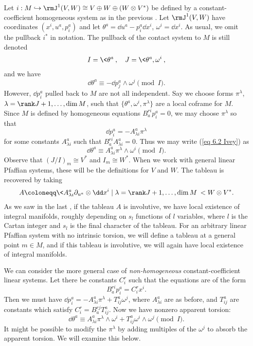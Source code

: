 \begin{example}\label{ex linear pfaff}
    Let $i:M\hookrightarrow \rmJ^1(V,W)\cong V\oplus W\oplus (W\otimes V^\ast)$ be defined by a constant-coefficient homogeneous system as in the previous \sect. Let $\rmJ^1(V,W)$ have coordinates $(x^i,u^a,p^a_i)$ and let $\theta^a=\dd u^a-p^a_i \dd x^i$, $\omega^i=\dd x^i$. As usual, we omit the pullback $i^\ast$ in notation. The pullback of the contact system to $M$ is still denoted 
    \[I=\<\theta^a\>,\quad J=\<\theta^a,\omega^i\>,\]
    and we have 
    \[\dd\theta^a\equiv -\dd p^a_j\wedge \omega^j\pmod{I}.\label{eq 6.2 Ivey}\]
    However, $\dd p^a_i$ pulled back to $M$ are not all independent. Say we choose forms $\pi^\lambda$, $\lambda=\rank J+1,\ldots,\dim M$, such that $\{\theta^a,\omega^i,\pi^\lambda\}$ are a local coframe for $M$. Since $M$ is defined by homogeneous equations $B^{ri}_a p^a_i=0$, we may choose  $\pi^\lambda$ so that 
    \[\dd p^a_i=-A^a_{\lambda i}\pi^\lambda\]
    for some constants $A^a_{\lambda i}$ such that $B^{ri}_a A^a_{\lambda i}=0$. Thus we may write (\ref{eq 6.2 Ivey}) as 
    \[\dd\theta^a\equiv A^a_{\lambda i}\pi^\lambda\wedge\omega^i \pmod{I}.\]
    Observe that $(J\slash I)_m\cong V^\ast$  and $I_m\cong W^\ast$. When we work with general linear Pfaffian systems, these will be the definitions for $V$ and $W$. The tableau is recovered by taking 
    \[A\coloneqq \<A^a_{\lambda i}\partial_{u^a}\otimes \dd x^i\mid \lambda=\rank J+1,\ldots,\dim M\>< W\otimes V^\ast.\]
    As we saw in the last \sect, if the tableau $A$ is involutive, we have local existence of integral manifolds, roughly depending on $s_l$ functions of $l$ variables, where $l$ is the Cartan integer and $s_l$ is the final character of the tableau. For an arbitrary linear Pfaffian system with no intrinsic torsion, we will define a tableau at a general point $m\in M$, and if this tableau is involutive, we will again have local existence of integral manifolds.
\end{example}


\begin{rem}\label{rem 6.3.1 Ivey}
    We can consider the more general case of \emph{non-homogeneous} constant-coefficient linear systems. Let there be constants $C^r_i$ such that the equations are of the form 
    \[B^{ri}_a p^a_i=C^r_i x^i.\]
    Then we must have $\dd p^a_i=-A^a_{\lambda i}\pi^\lambda+T^a_{ij}\omega^j$, where $A^a_{\lambda i}$ are as before, and $T^a_{ij}$ are constants which satisfy $C^r_i=B_a^{rj}T^a_{ij}$. Now we have nonzero apparent torsion:
    \[\dd\theta^a\equiv A^a_{\lambda i}\pi^\lambda \wedge \omega^i+T^a_{ij}\omega^i\wedge\omega^j\pmod{I}.\]
    It might be possible to modify the $\pi^\lambda$ by adding multiples of the $\omega^j$ to absorb the apparent torsion. We will examine this below.
\end{rem}

